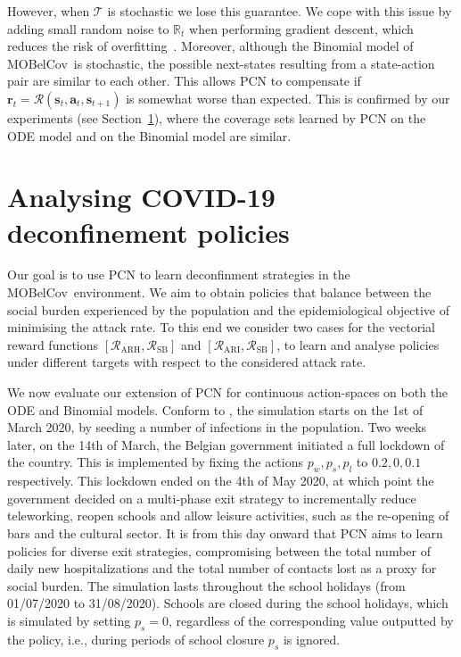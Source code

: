 \documentclass{article}
\renewcommand{\cite}[1]{\citep{#1}}
\newcommand{\mdptransition}{\mathcal{T}}
\newcommand{\mdprewardfn}{\mathcal{R}}
\newcommand{\momdprewardfn}{\bm{\mathcal{R}}}
\newcommand{\mdpstate}{\mathbf{s}}
\newcommand{\momdpreward}{\mathbf{r}}
\newcommand{\mdpaction}{\mathbf{a}}
\newcommand{\momdpname}{MOBelCov}
\begin{document}
However, when $\mdptransition$ is stochastic we lose this guarantee. We cope with this issue by adding small random noise to $\mathbb{R}_t$ when performing gradient descent, which reduces the risk of overfitting~\cite{zur2009noise}. Moreover, although the Binomial model of \momdpname\ is stochastic, the possible next-states resulting from a state-action pair are similar to each other. This allows PCN to compensate if $\momdpreward_t = \momdprewardfn(\mdpstate_t, \mdpaction_t, \mdpstate_{t+1})$ is somewhat worse than expected. This is confirmed by our experiments (see Section~\ref{sec:experiments}), where the coverage sets learned by PCN on the ODE model and on the Binomial model are similar.

\section{Analysing COVID-19 deconfinement policies}
\label{sec:experiments}
Our goal is to use PCN to learn deconfinment strategies in the \momdpname\ environment. We aim to obtain policies that balance between the social burden experienced by the population and the epidemiological objective of minimising the attack rate. To this end we consider two cases for the vectorial reward functions $[\mdprewardfn_\text{ARH}, \mdprewardfn_\text{SB}]$ and $[\mdprewardfn_\text{ARI}, \mdprewardfn_\text{SB}]$, to learn and analyse policies under different targets with respect to the considered attack rate.

We now evaluate our extension of PCN for continuous action-spaces on both the ODE and Binomial models. Conform to \citet{abrams2021modelling}, the simulation starts on the 1st of March 2020, by seeding a number of infections in the population. Two weeks later, on the 14th of March, the Belgian government initiated a full lockdown of the country. This is implemented by fixing the actions $p_w, p_s, p_l$ to $0.2, 0, 0.1$ respectively. This lockdown ended on the 4th of May 2020, at which point the government decided on a multi-phase exit strategy to incrementally reduce teleworking, reopen schools and allow leisure activities, such as the re-opening of bars and the cultural sector. It is from this day onward that PCN aims to learn policies for diverse exit strategies, compromising between the total number of daily new hospitalizations and the total number of contacts lost as a proxy for social burden. The simulation lasts throughout the school holidays (from 01/07/2020 to 31/08/2020). Schools are closed during the school holidays, which is simulated by setting $p_s = 0$, regardless of the corresponding value outputted by the policy, i.e., during periods of school closure $p_s$ is ignored.
\end{document}
